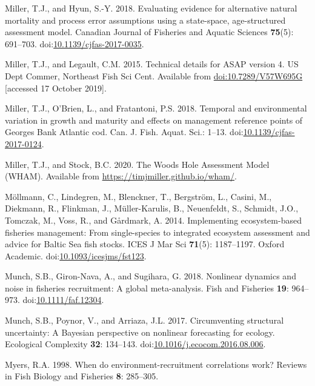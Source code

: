 \documentclass[]{article}
\begin{document}
\leavevmode\hypertarget{ref-miller2018Evaluating}{}%
Miller, T.J., and Hyun, S.-Y. 2018. Evaluating evidence for alternative
natural mortality and process error assumptions using a state-space,
age-structured assessment model. Canadian Journal of Fisheries and
Aquatic Sciences \textbf{75}(5): 691--703.
doi:\href{https://doi.org/10.1139/cjfas-2017-0035}{10.1139/cjfas-2017-0035}.

\leavevmode\hypertarget{ref-miller2015Technical}{}%
Miller, T.J., and Legault, C.M. 2015. Technical details for ASAP version
4. US Dept Commer, Northeast Fish Sci Cent. Available from
\url{doi:10.7289/V57W695G} {[}accessed 17 October 2019{]}.

\leavevmode\hypertarget{ref-miller2018Temporal}{}%
Miller, T.J., O'Brien, L., and Fratantoni, P.S. 2018. Temporal and
environmental variation in growth and maturity and effects on management
reference points of Georges Bank Atlantic cod. Can. J. Fish. Aquat.
Sci.: 1--13.
doi:\href{https://doi.org/10.1139/cjfas-2017-0124}{10.1139/cjfas-2017-0124}.

\leavevmode\hypertarget{ref-miller2020Woods}{}%
Miller, T.J., and Stock, B.C. 2020. The Woods Hole Assessment Model
(WHAM). Available from \url{https://timjmiller.github.io/wham/}.

\leavevmode\hypertarget{ref-mollmann2014Implementing}{}%
Möllmann, C., Lindegren, M., Blenckner, T., Bergström, L., Casini, M.,
Diekmann, R., Flinkman, J., Müller-Karulis, B., Neuenfeldt, S., Schmidt,
J.O., Tomczak, M., Voss, R., and Gårdmark, A. 2014. Implementing
ecosystem-based fisheries management: From single-species to integrated
ecosystem assessment and advice for Baltic Sea fish stocks. ICES J Mar
Sci \textbf{71}(5): 1187--1197. Oxford Academic.
doi:\href{https://doi.org/10.1093/icesjms/fst123}{10.1093/icesjms/fst123}.

\leavevmode\hypertarget{ref-munch2018Nonlinear}{}%
Munch, S.B., Giron-Nava, A., and Sugihara, G. 2018. Nonlinear dynamics
and noise in fisheries recruitment: A global meta-analysis. Fish and
Fisheries \textbf{19}: 964--973.
doi:\href{https://doi.org/10.1111/faf.12304}{10.1111/faf.12304}.

\leavevmode\hypertarget{ref-munch2017Circumventing}{}%
Munch, S.B., Poynor, V., and Arriaza, J.L. 2017. Circumventing
structural uncertainty: A Bayesian perspective on nonlinear forecasting
for ecology. Ecological Complexity \textbf{32}: 134--143.
doi:\href{https://doi.org/10.1016/j.ecocom.2016.08.006}{10.1016/j.ecocom.2016.08.006}.

\leavevmode\hypertarget{ref-myers1998When}{}%
Myers, R.A. 1998. When do environment-recruitment correlations work?
Reviews in Fish Biology and Fisheries \textbf{8}: 285--305.
\end{document}
